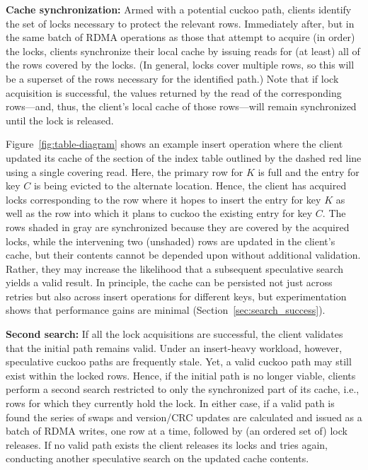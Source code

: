 
\textbf{Cache synchronization:} Armed with a potential cuckoo path,
clients identify the set of locks necessary to protect the relevant
rows.  Immediately after, but in the same batch of RDMA operations as
those that attempt to acquire (in order) the locks, clients
synchronize their local cache by issuing reads for (at least) all of
the rows covered by the locks.  (In general, locks cover multiple
rows, so this will be a superset of the rows necessary for the
identified path.)  Note that if lock acquisition is successful, the
values returned by the read of the corresponding rows---and, thus, the
client's local cache of those rows---will remain synchronized until
the lock is released.

Figure~\ref{fig:table-diagram} shows an example insert operation where
the client updated its cache of the section of the
index table outlined by the dashed red line using a single covering read.
Here, the primary row for $K$ is full and the entry for key $C$ is
being evicted to the alternate location.  Hence, the client has
acquired locks corresponding to the row where it hopes to insert the
entry for key $K$ as well as the row into which it plans to cuckoo the
existing entry for key $C$.  The rows shaded in gray are synchronized
because they are covered by the acquired locks, while the intervening
two (unshaded) rows are updated in the client's cache, but their
contents cannot be depended upon without additional validation.
Rather, they may increase the likelihood that a subsequent speculative
search yields a valid result.
In principle, the cache can be persisted not just across retries but also across
insert operations for different keys, but
experimentation shows that performance gains are minimal
(Section~\ref{sec:search_success}).

\textbf{Second search:} If all the lock acquisitions are successful,
the client validates that the initial path remains valid.  Under an
insert-heavy workload, however, speculative cuckoo paths are
frequently stale.  Yet, a valid cuckoo path may still exist within the
locked rows.  Hence, if the initial path is no longer viable, clients
perform a second search restricted to only the synchronized part of
its cache, i.e., rows for which they currently hold the lock.  In
either case, if a valid path is found the series of swaps and
version/CRC updates are calculated and issued as a batch of RDMA
writes, one row at a time, followed by (an ordered set of) lock
releases. If no valid path exists the client releases its locks and
tries again, conducting another speculative search on the updated
cache contents.

